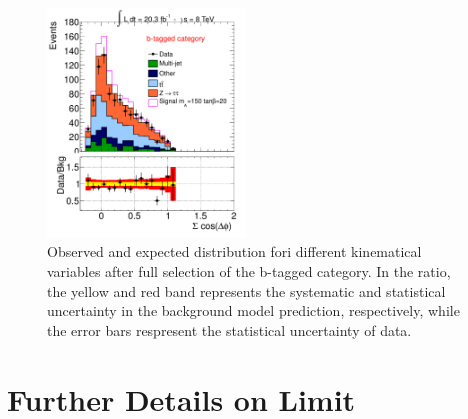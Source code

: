 \begin{figure}[!p]
\begin{center}
            \includegraphics[page=6, width=0.47\textwidth]{figure/final_plots/BTag_fulll.pdf}
    \end{center}
    \caption{ Observed and expected distribution fori different kinematical variables after full selection of the b-tagged category.
	 In the ratio, the yellow and red band represents the systematic and statistical uncertainty in the background model prediction, 
	respectively,  while the error bars respresent the statistical uncertainty of data.}
\end{figure}


\clearpage

\chapter{Further Details on Limit}
\label{appendix:limit}

